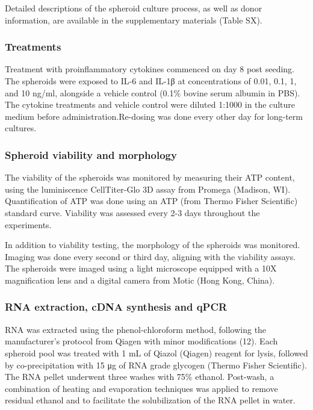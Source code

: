 \documentclass[
  letterpaper,
  DIV=11,
  numbers=noendperiod,
  oneside]{scrartcl}
\begin{document}
Detailed descriptions of the spheroid culture process, as well as donor
information, are available in the supplementary materials (Table SX).

\subsubsection{Treatments}\label{treatments}

Treatment with proinflammatory cytokines commenced on day 8 post
seeding. The spheroids were exposed to IL-6 and IL-1β at concentrations
of 0.01, 0.1, 1, and 10 ng/ml, alongside a vehicle control (0.1\% bovine
serum albumin in PBS). The cytokine treatments and vehicle control were
diluted 1:1000 in the culture medium before administration.Re-dosing was
done every other day for long-term cultures.

\subsubsection{Spheroid viability and
morphology}\label{spheroid-viability-and-morphology}

The viability of the spheroids was monitored by measuring their ATP
content, using the luminiscence CellTiter-Glo 3D assay from Promega
(Madison, WI). Quantification of ATP was done using an ATP (from Thermo
Fisher Scientific) standard curve. Viability was assessed every 2-3 days
throughout the experiments.

In addition to viability testing, the morphology of the spheroids was
monitored. Imaging was done every second or third day, aligning with the
viability assays. The spheroids were imaged using a light microscope
equipped with a 10X magnification lens and a digital camera from Motic
(Hong Kong, China).

\subsubsection{RNA extraction, cDNA synthesis and
qPCR}\label{rna-extraction-cdna-synthesis-and-qpcr}

RNA was extracted using the phenol-chloroform method, following the
manufacturer's protocol from Qiagen with minor modifications (12). Each
spheroid pool was treated with 1 mL of Qiazol (Qiagen) reagent for
lysis, followed by co-precipitation with 15 μg of RNA grade glycogen
(Thermo Fisher Scientific). The RNA pellet underwent three washes with
75\% ethanol. Post-wash, a combination of heating and evaporation
techniques was applied to remove residual ethanol and to facilitate the
solubilization of the RNA pellet in water.
\end{document}
